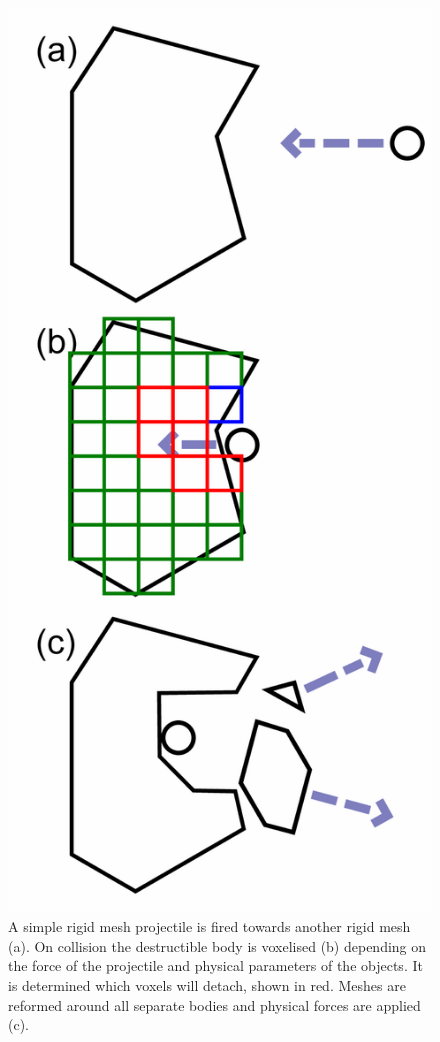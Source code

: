 \begin{figure}
\centerline{\includegraphics[scale=0.6]{diagram13.pdf}}
\caption{A simple rigid mesh projectile is fired towards another rigid mesh (a). On collision the destructible body is voxelised (b) depending on the force of the projectile and physical parameters of the objects. It is determined which voxels will detach, shown in red. Meshes are reformed around all separate bodies and physical forces are applied (c).}
\label{fig:1.2}
\end{figure}

